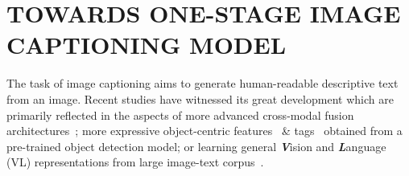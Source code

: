 \chapter{TOWARDS ONE-STAGE IMAGE CAPTIONING MODEL}

The task of image captioning aims to generate human-readable descriptive text from an image. Recent studies have witnessed its great development which are primarily reflected in the aspects of more advanced cross-modal fusion architectures~\citep{you2016image,vinyals2015show, xu2015show,rennie2017self,yang2019auto,cornia2020meshed,pan2020x,ting2019hierarchy,zhang2021rstnet}; more expressive object-centric features~\citep{anderson2018bottom,zhang2021multi} \& tags~\citep{li2020oscar,hu2020vivo,wang2020minivlm,fang2021compressing} obtained from a pre-trained object detection model; or learning general \textbf{\textit{V}}ision and \textbf{\textit{L}}anguage (VL) representations from large image-text corpus~\citep{zhou2020unified,xu2021e2e,li2020oscar,wang2021simvlm,wang2020minivlm,fang2021compressing}.

